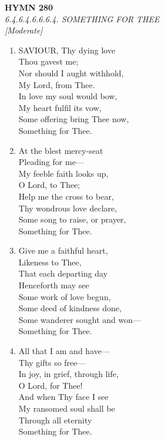 \documentclass[11pt,a4paper]{article}
\begin{document}
\newpage
\begin{center}
    {\Large \textbf{HYMN 280}}
    \\
    \textit{6.4.6.4.6.6.6.4. SOMETHING FOR THEE}
    \\
    \textit{\small [Moderate]}
\end{center}
\vspace{1em}

\begin{enumerate}
    \item SAVIOUR, Thy dying love \\
        Thou gavest me; \\
        Nor should I aught withhold, \\
        My Lord, from Thee. \\
        In love my soul would bow, \\
        My heart fulfil its vow, \\
        Some offering bring Thee now, \\
        Something for Thee.

    \item At the blest mercy-seat \\
        Pleading for me--- \\
        My feeble faith looks up, \\
        O Lord, to Thee; \\
        Help me the cross to bear, \\
        Thy wondrous love declare, \\
        Some song to raise, or prayer, \\
        Something for Thee.

    \item Give me a faithful heart, \\
        Likeness to Thee, \\
        That each departing day \\
        Henceforth may see \\
        Some work of love begun, \\
        Some deed of kindness done, \\
        Some wanderer sought and won--- \\
        Something for Thee.

    \item All that I am and have--- \\
        Thy gifts so free--- \\
        In joy, in grief, through life, \\
        O Lord, for Thee! \\
        And when Thy face I see \\
        My ransomed soul shall be \\
        Through all eternity \\
        Something for Thee.

\end{enumerate}
\end{document}
